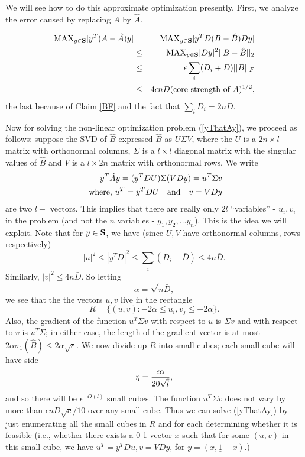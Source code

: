 \documentclass{book}
\numberwithin{exercise}{chapter}
\begin{document}
We will see how to do this approximate optimization presently.
First, we analyze the error caused by replacing
$A$ by $\hat A$.

\begin{eqnarray*}
\hbox{MAX}_{y\in {\bf S}} |y^T(A-\hat A)y| &=&\hbox{MAX}_{y\in {\bf S}} |y^TD(B-\hat B)Dy|\\
&\leq& \hbox{MAX}_{y\in {\bf S}}|Dy|^2 ||B-\hat B||_2\\
&\leq& \epsilon \sum_i (D_i+\bar D)||B||_F\\
&\leq& 4\epsilon n\bar D (\hbox{core-strength of }A)^{1/2},
\end{eqnarray*}
the last because of Claim  \ref{BF}
and the fact that $\sum_i D_i = 2n\bar D$.

Now for solving the non-linear optimization problem
(\ref{yThatAy}), we proceed as follows: suppose the
SVD of $\hat B$ expressed $\hat B$ as $U\Sigma V$,
where the $U$ is a $2n\times l$ matrix with orthonormal
columns, $\Sigma $ is a $l\times l$ diagonal matrix with
the singular values of $\hat B$ and $V$ is a $l\times 2n$
matrix with orthonormal rows. We write
\begin{eqnarray*}
y^T\hat Ay=(y^TDU)\Sigma (VDy)=u^T\Sigma v\\
\hbox{ where,  } u^T=y^TDU \quad \hbox{and}\quad
v=VDy
\end{eqnarray*}
are two $l-$ vectors. This
implies that there are really only $2l$ ``variables'' -
$u_i,v_i$ in the
problem (and not the $n$ variables - $y_1,y_2,\ldots y_n$).
This is the idea we will exploit.
Note that for $y\in {\bf S}$, we have (since $U,V$ have orthonormal
columns, rows respectively)
\[
|u|^2\leq |y^TD|^2\leq \sum_i (D_i+\bar D)\leq 4n\bar D.
\]
Similarly,  $|v|^2\leq 4n \bar D$.
So letting
$$\alpha =\sqrt {n\bar D},$$
we see that the the vectors $u,v$ live in the rectangle
$$R=\{ (u,v) : -2\alpha \leq u_i,v_j\leq +2\alpha \}.$$
Also, the gradient of the function $u^T\Sigma v$ with respect to
$u$ is $\Sigma v$ and with respect to $v$ is $u^T\Sigma$; in either
case, the length of the gradient vector is at most $2\alpha
\sigma_1(\hat B)\leq 2\alpha \sqrt c$. We now divide up $R$
into small cubes; each small cube will have side
$$\eta ={\epsilon \alpha \over 20 \sqrt {l}},$$
and so there will be $ \epsilon ^{-O(l)}$ small cubes.
The function $u^T\Sigma v$ does not vary by more than
$\epsilon n\bar D\sqrt c/10$ over any small cube. Thus we can
solve (\ref{yThatAy}) by just enumerating all the small cubes
in $R$  and for each determining whether it is feasible
(i.e., whether there exists a 0-1 vector $x$ such that for
some $(u,v)$ in this small cube, we have $u^T=y^TDu, v=VDy$,
for $y=(x,\underline 1-x)$.)
\end{document}
